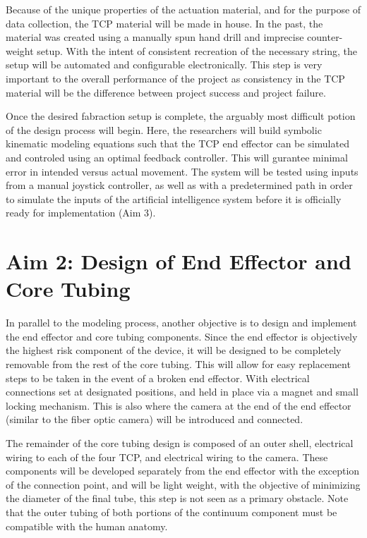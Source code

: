 	Because of the unique properties of the actuation material, and for the purpose of data collection, the TCP material will be made in house. In the past, the material was created using a manually spun hand drill and imprecise counter-weight setup. With the intent of consistent recreation of the necessary string, the setup will be automated and configurable electronically. This step is very important to the overall performance of the project as consistency in the TCP material will be the difference between project success and project failure.
	
	Once the desired fabraction setup is complete, the arguably most difficult potion of the design process will begin. Here, the researchers will build symbolic kinematic modeling equations such that the TCP end effector can be simulated and controled using an optimal feedback controller. This will gurantee minimal error in intended versus actual movement. The system will be tested using inputs from a manual joystick controller, as well as with a predetermined path in order to simulate the inputs of the artificial intelligence system before it is officially ready for implementation (Aim 3).
	
	\section{Aim 2: Design of End Effector and Core Tubing}
	\label{subsect:aim2}
	
	In parallel to the modeling process, another objective is to design and implement the end effector and core tubing components. Since the end effector is objectively the highest risk component of the device, it will be designed to be completely removable from the rest of the core tubing. This will allow for easy replacement steps to be taken in the event of a broken end effector. With electrical connections set at designated positions, and held in place via a magnet and small locking mechanism.	 This is also where the camera at the end of the end effector (similar to the fiber optic camera) will be introduced and connected.
	
	The remainder of the core tubing design is composed of an outer shell, electrical wiring to each of the four TCP, and electrical wiring to the camera. These components will be developed separately from the end effector with the exception of the connection point, and will be light weight, with the objective of minimizing the diameter of the final tube, this step is not seen as a primary obstacle. Note that the outer tubing of both portions of the continuum component must be compatible with the human anatomy.
	
